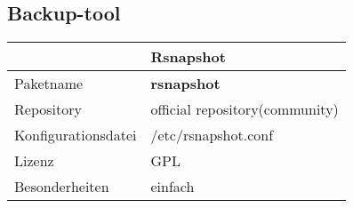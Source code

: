 \subsection{Backup-tool}
\begin{tabular}{l|l}
~ & Rsnapshot \\ \hline
Paketname & \textbf{rsnapshot} \\ 
Repository & official repository(community) \\
Konfigurationsdatei & /etc/rsnapshot.conf \\
Lizenz & GPL \\
Besonderheiten & einfach \\
\end{tabular}
